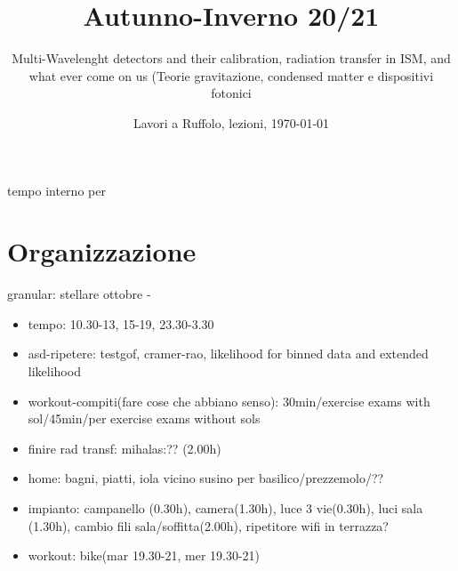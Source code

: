 \documentclass[10pt,xcolor={usenames},fleqn,mathserif,serif]{beamer}
\title{Autunno-Inverno 20/21}
\subtitle{Multi-Wavelenght detectors and their calibration, radiation transfer in ISM, and what ever come on us (Teorie gravitazione, condensed matter e dispositivi fotonici}
\date{Lavori a Ruffolo, lezioni, \today}
\begin{document}


\begin{frame}
  \titlepage
\end{frame}

\begin{frame}{tempo interno per}
\tableofcontents[onlyparts]
\end{frame}


\part{Organizzazione}

\begin{frame}{granular: stellare ottobre - }
    \begin{itemize}
        \item tempo: 10.30-13, 15-19, 23.30-3.30
        \item asd-ripetere: testgof, cramer-rao, likelihood for binned data and extended likelihood
        \item workout-compiti(fare cose che abbiano senso): 30min/exercise exams with sol/45min/per exercise exams without sols
        \item finire rad transf: mihalas:?? (2.00h)
        \item home: bagni, piatti, iola vicino susino per basilico/prezzemolo/??
        \item impianto: campanello (0.30h), camera(1.30h), luce 3 vie(0.30h), luci sala (1.30h), cambio fili sala/soffitta(2.00h), ripetitore wifi in terrazza?
        \item workout: bike(mar 19.30-21, mer 19.30-21)
    \end{itemize}
\end{frame}
\end{document}
